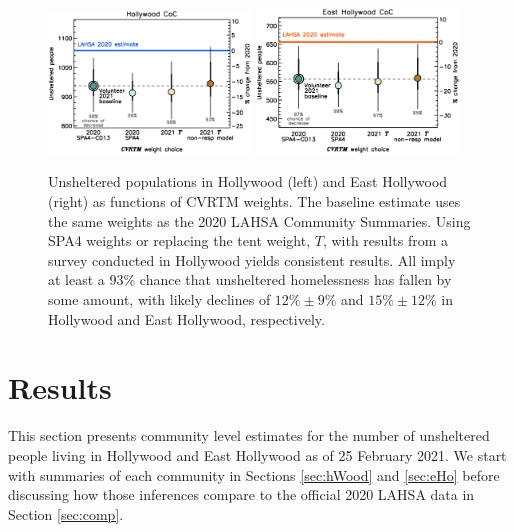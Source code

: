 \documentclass[11pt,twocolumn]{article}
\def\bfr{\bf\color{red}}
\def\resp{respectively}
\begin{document}
\begin{figure}[t]
	\centering
	\includegraphics[width = 0.48\textwidth, trim = 0cm 0.5cm 0cm 0cm]{hwoodFinal}
	\includegraphics[width = 0.48\textwidth, trim = 0cm 0.5cm 0cm 0cm]{ehoFinal}	
	\caption{Unsheltered populations in Hollywood (left) and East Hollywood (right) 
			as functions of CVRTM weights. The baseline estimate uses the same weights as the 
			2020 LAHSA Community Summaries. Using SPA4 weights or replacing the tent 
			weight, $T$, with results from a survey conducted in Hollywood yields consistent
			results. All imply at least a 93\% chance that unsheltered homelessness has fallen
			by some amount, with likely declines of $12\%\pm9\%$ and $15\%\pm12\%$
			in Hollywood and East Hollywood, \resp.}
	\label{fig:wtComp}
\end{figure}

%
%


\section{Results}
\label{sec:results}

This section presents community level estimates for the number of unsheltered people living in
Hollywood and East Hollywood as of 25 February 2021. We start with summaries of each community 
in Sections \ref{sec:hWood} and \ref{sec:eHo} before discussing how those inferences compare to 
the official 2020 LAHSA data in Section \ref{sec:comp}. 
\end{document}
